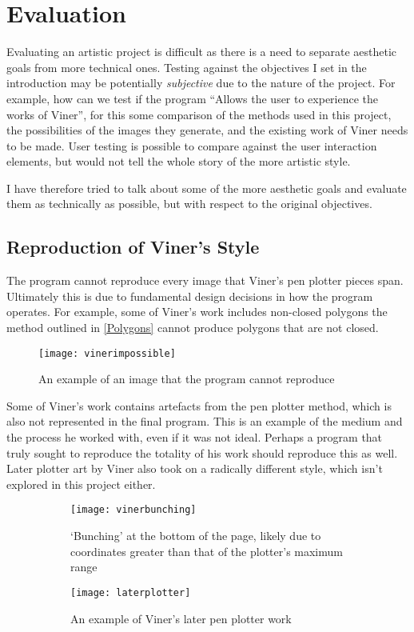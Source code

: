 \chapter{Evaluation}
Evaluating an artistic project is difficult as there is a need to separate
aesthetic goals from more technical ones. Testing against the objectives I set
in the introduction may be potentially \emph{subjective} due to the nature of
the project. For example, how can we test if the program ``Allows the user to
experience the works of Viner'', for this some comparison of the methods used in
this project, the possibilities of the images they generate, and the existing
work of Viner needs to be made. User testing is possible to compare against the
user interaction elements, but would not tell the whole story of the more
artistic style.

I have therefore tried to talk about some of the more aesthetic goals and
evaluate them as technically as possible, but with respect to the original
objectives.

\section{Reproduction of Viner's Style}
The program cannot reproduce every image that Viner's pen plotter pieces span.
Ultimately this is due to fundamental design decisions in how the program
operates. For example, some of Viner's work includes non-closed polygons the
method outlined in \autoref{Polygons} cannot produce polygons that are not
closed. 

\begin{figure}[H]
    \centering
    \texttt{[image: vinerimpossible]}
    \caption{An example of an image that the program cannot reproduce}
\end{figure}

Some of Viner's work contains artefacts from the pen plotter method, which is
also not represented in the final program. This is an example of the medium and
the process he worked with, even if it was not ideal. Perhaps a program that
truly sought to reproduce the totality of his work should reproduce this as
well. Later plotter art by Viner also took on a radically different style, which
isn't explored in this project either.

\begin{figure}[H]
    \centering
    \begin{subfigure}[t]{0.49\textwidth}
        \centering
        \texttt{[image: vinerbunching]}
        \caption{`Bunching' at the bottom of the page, likely due to coordinates
        greater than that of the plotter's maximum range}
    \end{subfigure}
    \hfill
    \begin{subfigure}[t]{0.49\textwidth}
        \centering
        \texttt{[image: laterplotter]}
        \caption{An example of Viner's later pen plotter work}
    \end{subfigure}
    \caption{}
\end{figure}


